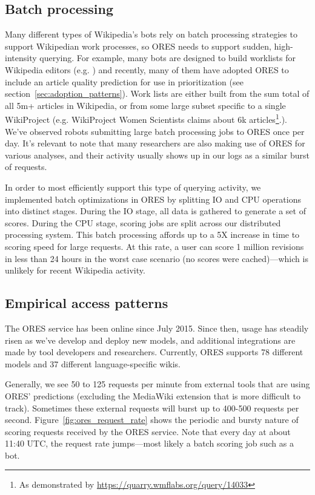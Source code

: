 \subsection{Batch processing}
Many different types of Wikipedia's bots rely on batch processing strategies to support Wikipedian work processes\cite{geiger11lives}, so ORES needs to support sudden, high-intensity querying.  For example, many bots are designed to build worklists for Wikipedia editors (e.g. \cite{cosley08suggestbot}) and recently, many of them have adopted ORES to include an article quality prediction for use in prioritization (see section~\ref{sec:adoption_patterns}).  Work lists are either built from the sum total of all 5m+ articles in Wikipedia, or from some large subset specific to a single WikiProject (e.g. WikiProject Women Scientists claims about 6k articles\footnote{As demonstrated by \url{https://quarry.wmflabs.org/query/14033}}.).  We've observed robots submitting large batch processing jobs to ORES once per day.  It's relevant to note that many researchers are also making use of ORES for various analyses, and their activity usually shows up in our logs as a similar burst of requests.

In order to most efficiently support this type of querying activity, we implemented batch optimizations in ORES by splitting IO and CPU operations into distinct stages.  During the IO stage, all data is gathered to generate a set of scores.  During the CPU stage, scoring jobs are split across our distributed processing system.  This batch processing affords up to a 5X increase in time to scoring speed for large requests\cite{sarabadani2017building}.  At this rate, a user can score 1 million revisions in less than 24 hours in the worst case scenario (no scores were cached)---which is unlikely for recent Wikipedia activity.

\subsection{Empirical access patterns}


The ORES service has been online since July 2015\cite{halfaker2015artificial}.  Since then, usage has steadily risen as we've develop and deploy new models, and additional integrations are made by tool developers and researchers.  Currently, ORES supports 78 different models and 37 different language-specific wikis.

Generally, we see 50 to 125 requests per minute from external tools that are using ORES' predictions (excluding the MediaWiki extension that is more difficult to track).  Sometimes these external requests will burst up to 400-500 requests per second.  Figure~\ref{fig:ores_request_rate} shows the periodic and bursty nature of scoring requests received by the ORES service.  Note that every day at about 11:40 UTC, the request rate jumps---most likely a batch scoring job such as a bot.


